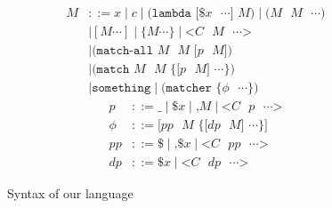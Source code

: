 \documentclass[9pt, a4paper]{extarticle}
\begin{document}
\begin{figure}[!t]
    \begin{multicols}{2}
        \noindent
        \begin{align*}
            M &::= x \mid c \mid \texttt{(lambda [\$$x$ $\cdots$] $M$)} \mid \texttt{($M$ $M$ $\cdots$)} \\
            &\mid [M \cdots] \mid \{M \cdots\} \mid \texttt{<$C$ $M$ $\cdots$>} \\
            &\mid \texttt{(match-all $M$ $M$ [$p$ $M$])} \\
            &\mid \texttt{(match $M$ $M$ \{[$p$ $M$] $\cdots$\})} \\
            &\mid \texttt{something} \mid \texttt{(matcher \{$\phi$ $\cdots$\})}
        \end{align*}
        \columnbreak
        \begin{align*}
            p &::= \texttt{_} \mid \texttt{\$$x$} \mid \texttt{,$M$} \mid \texttt{<$C$ $p$ $\cdots$>} \\
            \phi &::= \texttt{[$pp$ $M$ \{[$dp$ $M$] $\cdots$\}]} \\
            pp &::= \texttt{\$} \mid \texttt{,\$$x$} \mid \texttt{<$C$ $pp$ $\cdots$>} \\
            dp &::= \texttt{\$$x$} \mid \texttt{<$C$ $dp$ $\cdots$>}
        \end{align*}
    \end{multicols}
    \caption{Syntax of our language}
    \label{fig:syntax}
\end{figure}
\end{document}
